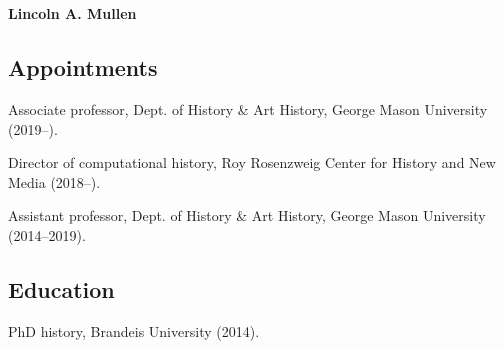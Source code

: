 \documentclass[11pt]{article}
\begin{document}
\thispagestyle{fancy}
\fancyfoot{}
\fancyhead{}
\renewcommand{\headrulewidth}{0pt}

\hfill\hfill\hfill
\hfill\hfill\hfill
\hfill\hfill\hfill
\hfill\hfill\hfill
\begin{minipage}[t]{2.2in}
   \\
   \\
\end{minipage}
\hfill
\begin{minipage}[t]{3.0in}
\end{minipage}

\vspace{0.4in}

{\large\sffamily\bfseries Lincoln A. Mullen}\\[-0.1in]

\subsection{Appointments}\label{Appointments}

Associate professor, Dept. of History \& Art History, George Mason University (2019--).

Director of computational history, Roy Rosenzweig Center for History and New Media (2018--).

Assistant professor, Dept. of History \& Art History, George Mason University (2014--2019).

\subsection{Education}\label{Education}

PhD history, Brandeis University (2014). 

\end{document}

